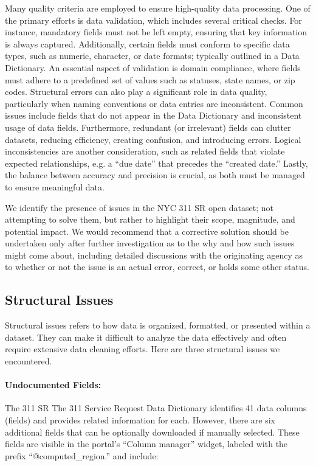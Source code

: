\documentclass[linenumber]{jdsart}
\begin{document}
Many quality criteria are employed to ensure high-quality data 
processing. One of the primary efforts is data validation, which includes 
several critical checks. For instance, mandatory fields must not be 
left empty, ensuring that key information is always captured. 
Additionally, certain fields must conform to specific data types, 
such as numeric, character, or date formats; typically 
outlined in a Data Dictionary. An essential aspect of 
validation is domain compliance, where 
fields must adhere to a predefined set of 
values such as statuses, state names, or zip codes. Structural 
errors can also play a significant role in data quality, particularly when 
naming conventions or data entries are inconsistent. Common issues 
include fields that do not appear in the Data Dictionary and  
inconsistent usage of data fields. Furthermore, redundant 
(or irrelevant) fields can clutter datasets, reducing efficiency, 
creating confusion, and introducing errors. Logical inconsistencies 
are another consideration, such as related fields that violate expected 
relationships, e.g. a ``due date'' that precedes the ``created date.'' 
Lastly, the balance between accuracy and precision is crucial, as both 
must be managed to ensure meaningful data.


We identify the presence of issues in the NYC 311 SR open dataset;
not attempting to solve them, but rather to highlight their scope, 
magnitude, and potential impact. We would recommend 
that a corrective solution should be undertaken only 
after further investigation as to the why and how such 
issues might come about, including  detailed discussions 
with the originating agency as to whether or not the issue is an 
actual error, correct,  or holds some other status.


\subsection{Structural Issues}
\label{sec:structural}
Structural issues refers to how data is organized, formatted, 
or presented within a dataset. They can make 
it difficult to analyze the data effectively and often require extensive 
data cleaning efforts. Here are three structural issues we encountered.
 
\paragraph{Undocumented Fields:} The 311 SR 
The 311 Service Request Data Dictionary identifies 
41 data columns (fields) and provides related information 
for each. However, there are six additional fields that can be
optionally downloaded if manually selected. These fields are 
visible in the portal's ``Column manager'' widget, labeled with the prefix 
``@computed\_region.'' and include:
\end{document}

